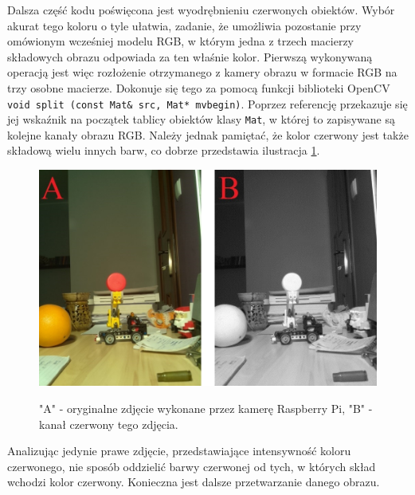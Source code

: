 Dalsza część kodu poświęcona jest wyodrębnieniu czerwonych obiektów. Wybór akurat tego koloru o tyle ułatwia, zadanie, że umożliwia pozostanie przy omówionym wcześniej modelu RGB, w którym jedna z trzech macierzy składowych obrazu odpowiada za ten właśnie kolor. Pierwszą wykonywaną operacją jest więc rozłożenie otrzymanego z kamery obrazu w formacie RGB na trzy osobne macierze. Dokonuje się tego za pomocą funkcji biblioteki OpenCV \texttt{void split (const Mat\& src, Mat* mvbegin)}. Poprzez referencję przekazuje się jej wskaźnik na początek tablicy obiektów klasy \texttt{Mat}, w której to zapisywane są kolejne kanały obrazu RGB. Należy jednak pamiętać, że kolor czerwony jest także składową wielu innych barw, co dobrze przedstawia ilustracja \ref{red}.\newpage
\begin{figure}[H]
\begin{center}
\includegraphics[scale=0.42]{imgs/imgBase+Red.jpg}
\caption[Uzyskany kanał czerwony wraz z oryginalny obrazem.]\small{"A" - oryginalne zdjęcie wykonane przez kamerę Raspberry Pi, "B" - kanał czerwony tego zdjęcia.}
\label{red}
\end{center}
\end{figure}
Analizując jedynie prawe zdjęcie, przedstawiające intensywność koloru czerwonego, nie sposób oddzielić barwy czerwonej od tych, w których skład wchodzi kolor czerwony. Konieczna jest dalsze przetwarzanie danego obrazu.


